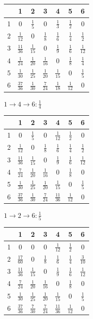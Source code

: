 \documentclass[russian]{article}
\begin{document}
\begin{tabular}{|c|c|c|c|c|c|c|}\hline
& 1& 2& 3& 4& 5& 6\\\hline
1& $0$& $\frac{1}{5}$& $0$& $\frac{1}{3}$& $\frac{1}{2}$& $0$\\\hline
2& $\frac{1}{12}$& $0$& $\frac{1}{8}$& $\frac{1}{6}$& $\frac{1}{4}$& $\frac{1}{2}$\\\hline
3& $\frac{11}{36}$& $\frac{1}{15}$& $0$& $\frac{1}{9}$& $\frac{1}{6}$& $\frac{1}{12}$\\\hline
4& $\frac{1}{24}$& $\frac{1}{20}$& $\frac{1}{16}$& $0$& $\frac{1}{8}$& $\frac{1}{4}$\\\hline
5& $\frac{1}{30}$& $\frac{1}{25}$& $\frac{1}{20}$& $\frac{1}{15}$& $0$& $\frac{1}{5}$\\\hline
6& $\frac{37}{36}$& $\frac{1}{30}$& $\frac{7}{24}$& $\frac{1}{18}$& $\frac{1}{12}$& $0$\\\hline
\end{tabular}

$ 1 \to 4 \to 6 : \frac{1}{4}$

\begin{tabular}{|c|c|c|c|c|c|c|}\hline
& 1& 2& 3& 4& 5& 6\\\hline
1& $0$& $\frac{1}{5}$& $0$& $\frac{1}{12}$& $\frac{1}{2}$& $0$\\\hline
2& $\frac{1}{12}$& $0$& $\frac{1}{8}$& $\frac{1}{6}$& $\frac{1}{4}$& $\frac{1}{2}$\\\hline
3& $\frac{11}{36}$& $\frac{1}{15}$& $0$& $\frac{1}{9}$& $\frac{1}{6}$& $\frac{1}{12}$\\\hline
4& $\frac{7}{24}$& $\frac{1}{20}$& $\frac{1}{16}$& $0$& $\frac{1}{8}$& $0$\\\hline
5& $\frac{1}{30}$& $\frac{1}{25}$& $\frac{1}{20}$& $\frac{1}{15}$& $0$& $\frac{1}{5}$\\\hline
6& $\frac{37}{36}$& $\frac{1}{30}$& $\frac{7}{24}$& $\frac{11}{36}$& $\frac{1}{12}$& $0$\\\hline
\end{tabular}

$ 1 \to 2 \to 6 : \frac{1}{5}$

\begin{tabular}{|c|c|c|c|c|c|c|}\hline
& 1& 2& 3& 4& 5& 6\\\hline
1& $0$& $0$& $0$& $\frac{1}{12}$& $\frac{1}{2}$& $0$\\\hline
2& $\frac{17}{60}$& $0$& $\frac{1}{8}$& $\frac{1}{6}$& $\frac{1}{4}$& $\frac{3}{10}$\\\hline
3& $\frac{11}{36}$& $\frac{1}{15}$& $0$& $\frac{1}{9}$& $\frac{1}{6}$& $\frac{1}{12}$\\\hline
4& $\frac{7}{24}$& $\frac{1}{20}$& $\frac{1}{16}$& $0$& $\frac{1}{8}$& $0$\\\hline
5& $\frac{1}{30}$& $\frac{1}{25}$& $\frac{1}{20}$& $\frac{1}{15}$& $0$& $\frac{1}{5}$\\\hline
6& $\frac{37}{36}$& $\frac{7}{30}$& $\frac{7}{24}$& $\frac{11}{36}$& $\frac{1}{12}$& $0$\\\hline
\end{tabular}
\end{document}
